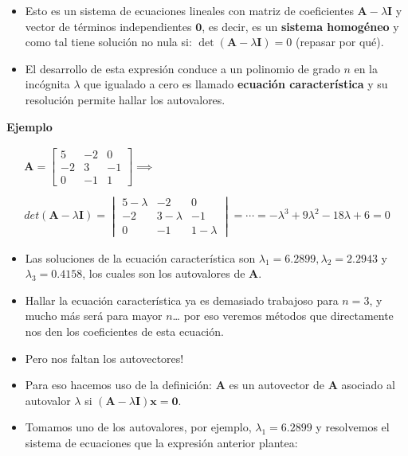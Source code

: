 \documentclass[openany]{book}
\providecommand{\tightlist}{%
  \setlength{\itemsep}{0pt}\setlength{\parskip}{0pt}}
\begin{document}
\begin{itemize}
\tightlist
\item
  Esto es un sistema de ecuaciones lineales con matriz de coeficientes \(\textbf{A} - \lambda \textbf{I}\) y vector de términos independientes \(\textbf{0}\), es decir, es un \textbf{sistema homogéneo} y como tal tiene solución no nula si: \(\det (\textbf{A} - \lambda \textbf{I}) = 0\) (repasar por qué).
\end{itemize}

\begin{itemize}
\tightlist
\item
  El desarrollo de esta expresión conduce a un polinomio de grado \(n\) en la incógnita \(\lambda\) que igualado a cero es llamado \textbf{ecuación característica} y su resolución permite hallar los autovalores.
\end{itemize}

\textbf{Ejemplo}

\begin{gather*}
\mathbf{A} = 
\begin{bmatrix} 
    5 & -2 & 0 \\ 
    -2 & 3 & -1 \\
    0 & -1 & 1    
\end{bmatrix} 
\implies \\ \\
 det(\textbf{A} - \lambda \textbf{I}) = 
\begin{vmatrix}
    5 - \lambda & -2 & 0 \\ 
    -2 & 3 - \lambda & -1 \\
    0 & -1 & 1-\lambda
\end{vmatrix}  = 
\cdots  = -\lambda^3 + 9 \lambda^2 - 18 \lambda + 6 = 0
\end{gather*}

\begin{itemize}
\item
  Las soluciones de la ecuación característica son \(\lambda_1 = 6.2899, \lambda_2 = 2.2943\) y \(\lambda_3 = 0.4158\), los cuales son los autovalores de \(\textbf{A}\).
\item
  Hallar la ecuación característica ya es demasiado trabajoso para \(n=3\), y mucho más será para mayor \(n\)\ldots{} por eso veremos métodos que directamente nos den los coeficientes de esta ecuación.
\item
  Pero nos faltan los autovectores!
\item
  Para eso hacemos uso de la definición: \(\textbf{A}\) es un autovector de \(\textbf{A}\) asociado al autovalor \(\lambda\) si \((\textbf{A} - \lambda \textbf{I}) \textbf{x} = \textbf{0}\).
\item
  Tomamos uno de los autovalores, por ejemplo, \(\lambda_1 = 6.2899\) y resolvemos el sistema de ecuaciones que la expresión anterior plantea:
\end{itemize}
\end{document}
